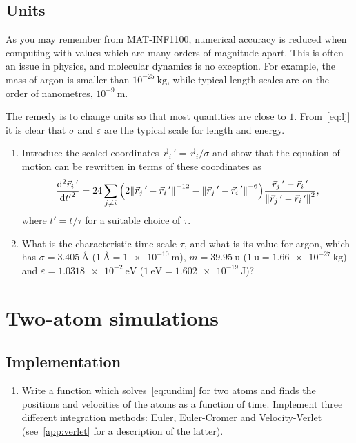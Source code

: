 \documentclass[11pt,british,a4paper]{report}
\begin{document}
\subsection{Units}
As you may remember from MAT-INF1100, numerical accuracy is reduced when computing with values which are many orders of magnitude apart. This is often an issue in physics, and molecular dynamics is no exception. For example, the mass of argon is smaller than \(10^{-25}\ \si{\kg}\), while typical length scales are on the order of nanometres, \(10^{-9}\ \si{\m}\).

The remedy is to change units so that most quantities are close to \(1\). From~\vref{eq:lj} it is clear that \(\sigma\) and \(\varepsilon\) are the typical scale for length and energy.

\begin{enumerate}[label=\roman*.]
    \item Introduce the scaled coordinates \(\vec{r}_i\,'=\vec{r}_i/\sigma\) and show that the equation of motion can be rewritten in terms of these coordinates as
    \begin{equation}
        \dv[2]{\vec{r}_i\,'}{{t'}} = 24 \sum_{j \neq i} \qty(2\norm{\vec{r}_j\,'-\vec{r}_i\,'}^{-12}-\norm{\vec{r}_j\,'-\vec{r}_i\,'}^{-6})\frac{\vec{r}_j\,'-\vec{r}_i\,'}{\norm{\vec{r}_j\,'-\vec{r}_i\,'}^2},\label{eq:undim}
    \end{equation}
    where \(t'=t/\tau\) for a suitable choice of \(\tau\).
    \item What is the characteristic time scale \(\tau\), and what is its value for argon, which has \(\sigma=\SI{3.405}{\angstrom}\) (\(\SI{1}{\angstrom}=\SI{1e-10}{\m}\)), \(m = \SI{39.95}{\atomicmassunit}\) (\(\SI{1}{\atomicmassunit} = \SI{1.66e-27}{\kg}\)) and \(\varepsilon=\SI{1.0318e-2}{\eV}\) (\(\SI{1}{\eV}=\SI{1.602e-19}{\J}\))?
\end{enumerate}



\section{Two-atom simulations}

\subsection{Implementation}
\begin{enumerate}[label=\roman*.]
    \item Write a function which solves~\vref{eq:undim} for two atoms and finds the positions and velocities of the atoms as a function of time. Implement three different integration methods:
        Euler, Euler-Cromer and Velocity-Verlet (see~\vref{app:verlet} for a description of the latter).
\end{enumerate}
\end{document}
